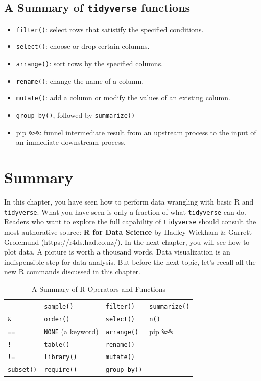 \documentclass[
  letterpaper,
]{book}
\begin{document}
\subsection{\texorpdfstring{A Summary of \texttt{tidyverse}
functions}{A Summary of tidyverse functions}}\label{a-summary-of-tidyverse-functions}

\begin{itemize}
\item
  \texttt{filter()}: select rows that satistify the specified
  conditions.
\item
  \texttt{select()}: choose or drop certain columns.
\item
  \texttt{arrange()}: sort rows by the specified columns.
\item
  \texttt{rename()}: change the name of a column.
\item
  \texttt{mutate()}: add a column or modify the values of an existing
  column.
\item
  \texttt{group\_by()}, followed by \texttt{summarize()}
\item
  pip \texttt{\%\textgreater{}\%}: funnel intermediate result from an
  upstream process to the input of an immediate downstream process.
\end{itemize}

\section{Summary}\label{summary-1}

In this chapter, you have seen how to perform data wrangling with basic
R and \texttt{tidyverse}. What you have seen is only a fraction of what
\texttt{tidyverse} can do. Readers who want to explore the full
capability of \texttt{tidyverse} should consult the most authorative
source: \textbf{R for Data Science} by Hadley Wickham \& Garrett
Grolemund (https://r4ds.had.co.nz/). In the next chapter, you will see
how to plot data. A picture is worth a thousand words. Data
visualization is an indispensible step for data analysis. But before the
next topic, let's recall all the new R commands discussed in this
chapter.

\begin{longtable}[]{@{}llll@{}}
\caption{A Summary of R Operators and Functions}\tabularnewline
\toprule\noalign{}
\endfirsthead
\endhead
\bottomrule\noalign{}
\endlastfoot
\textbar{} & \texttt{sample()} & \texttt{filter()} &
\texttt{summarize()} \\
\texttt{\&} & \texttt{order()} & \texttt{select()} & \texttt{n()} \\
\texttt{==} & \texttt{NONE} (a keyword) & \texttt{arrange()} & pip
\texttt{\%\textgreater{}\%} \\
\texttt{!} & \texttt{table()} & \texttt{rename()} & \\
\texttt{!=} & \texttt{library()} & \texttt{mutate()} & \\
\texttt{subset()} & \texttt{require()} & \texttt{group\_by()} & \\
\end{longtable}
\end{document}
